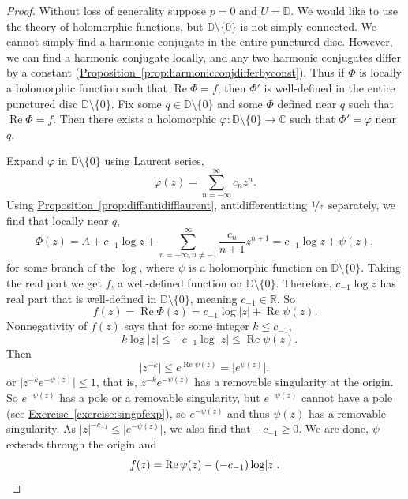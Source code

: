 \documentclass[12pt,openany]{book}
\renewcommand{\Re}{\operatorname{Re}}
\newcommand{\sabs}[1]{\lvert {#1} \rvert}
\newcommand{\babs}[1]{\bigl\lvert {#1} \bigr\rvert}
\newcommand{\C}{{\mathbb{C}}}
\newcommand{\R}{{\mathbb{R}}}
\newcommand{\D}{{\mathbb{D}}}
\theoremstyle{plain}
\theoremstyle{remark}
\theoremstyle{definition}
\theoremstyle{exercise}
\theoremstyle{example}
\newcommand{\exerciseref}[1]{\hyperref[#1]{Exercise~\ref*{#1}}}
\newcommand{\propref}[1]{\hyperref[#1]{Proposition~\ref*{#1}}}
\begin{document}
\begin{proof}
Without loss of generality suppose $p=0$ and $U = \D$.
We would like to use the theory of holomorphic functions,
but $\D \setminus \{ 0 \}$ is not simply connected.  We cannot simply find a
harmonic conjugate in the entire punctured disc.  However, we can find a harmonic
conjugate locally, and any two harmonic conjugates differ by a
constant (\propref{prop:harmonicconjdifferbyconst}).
Thus if $\Phi$ is locally a holomorphic function
such that $\Re \Phi = f$, then $\Phi'$ is well-defined in the entire
punctured disc $\D \setminus \{ 0 \}$.  Fix some $q \in \D \setminus \{ 0 \}$
and some $\Phi$ defined near $q$ such that $\Re \Phi = f$.
Then there exists a holomorphic $\varphi \colon
\D \setminus \{ 0 \} \to \C$ such that $\Phi' = \varphi$ near $q$.

Expand $\varphi$ in $\D \setminus \{ 0 \}$ using Laurent series,
\begin{equation*}
\varphi(z) = \sum_{n=-\infty}^\infty c_n {z}^n .
\end{equation*}
Using \propref{prop:diffantidifflaurent},
antidifferentiating $\nicefrac{1}{z}$ separately,
we find that locally near $q$,
\begin{equation*}
\Phi(z) =
A+
c_{-1} \log z +  
\sum_{n=-\infty,n\not=-1}^\infty \frac{c_n}{n+1} {z}^{n+1}
=
c_{-1} \log z +  
\psi(z),
\end{equation*}
for some branch of the $\log$, where $\psi$ is a holomorphic function
on $\D \setminus \{ 0 \}$.
Taking the real part we get $f$, a well-defined function on
$\D \setminus \{ 0 \}$.  Therefore,
$c_{-1} \log z$ has real part that is well-defined in $\D \setminus \{ 0 \}$,
meaning $c_{-1} \in \R$.
So
\begin{equation*}
f(z) = \Re \Phi(z) =
c_{-1} \log \sabs{z} +  
\Re \psi(z).
\end{equation*}
Nonnegativity of $f(z)$ says that
for some integer $k \leq c_{-1}$,
\begin{equation*}
-k \log \sabs{z} \leq
-c_{-1} \log \sabs{z} \leq  \Re \psi(z) .
\end{equation*}
Then
\begin{equation*}
\sabs{z^{-k}} \leq e^{\Re \psi(z)} = \babs{e^{\psi(z)}} ,
\end{equation*}
or 
$\sabs{z^{-k} e^{-\psi(z)}} \leq 1$, that is, $z^{-k} e^{-\psi(z)}$ has
a removable singularity at the origin.  So $e^{-\psi(z)}$ has
a pole or a removable singularity, but $e^{-\psi(z)}$ cannot have
a pole (see \exerciseref{exercise:singofexp}), so $e^{-\psi(z)}$
and thus $\psi(z)$ has a removable singularity.
As $\sabs{z}^{-c_{-1}} \leq \sabs{e^{-\psi(z)}}$, we also
find that $-c_{-1} \geq 0$.  We are done, $\psi$ extends through the origin
and
\begin{equation*}
f(z) = \Re \psi(z) - (-c_{-1}) \log \sabs{z} . \qedhere
\end{equation*}
\end{proof}
\end{document}
